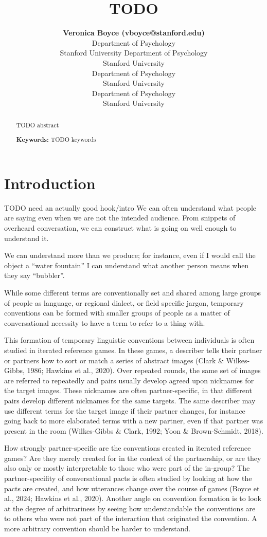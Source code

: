 \documentclass[10pt, letterpaper]{article}
\title{TODO}
\author{{\large \bf Veronica Boyce (vboyce@stanford.edu)} \\ Department of Psychology \\ Stanford University \And {\large \bf Ben Prystawski (benpry@stanford.edu)} Department of Psychology \\ Stanford University \AND {\large \bf Alvin Wei Ming Tan (tanawm@stanford.edu)} \\ Department of Psychology \\ Stanford University \And {\large \bf Michael C. Frank (mcfrank@stanford.edu)} \\ Department of Psychology \\ Stanford University}
\begin{document}
\maketitle

\begin{abstract}
TODO abstract

\textbf{Keywords:}
TODO keywords
\end{abstract}

\section{Introduction}\label{introduction}

TODO need an actually good hook/intro We can often understand what
people are saying even when we are not the intended audience. From
snippets of overheard conversation, we can construct what is going on
well enough to understand it.

We can understand more than we produce; for instance, even if I would
call the object a ``water fountain'' I can understand what another
person means when they say ``bubbler''.

While some different terms are conventionally set and shared among large
groups of people as language, or regional dialect, or field specific
jargon, temporary conventions can be formed with smaller groups of
people as a matter of conversational necessity to have a term to refer
to a thing with.

This formation of temporary linguistic conventions between individuals
is often studied in iterated reference games. In these games, a
describer tells their partner or partners how to sort or match a series
of abstract images (Clark \& Wilkes-Gibbs, 1986; Hawkins et al., 2020).
Over repeated rounds, the same set of images are referred to repeatedly
and pairs usually develop agreed upon nicknames for the target images.
These nicknames are often partner-specific, in that different pairs
develop different nicknames for the same targets. The same describer may
use different terms for the target image if their partner changes, for
instance going back to more elaborated terms with a new partner, even if
that partner was present in the room (Wilkes-Gibbs \& Clark, 1992; Yoon
\& Brown-Schmidt, 2018).

How strongly partner-specific are the conventions created in iterated
reference games? Are they merely created for in the context of the
partnership, or are they also only or mostly interpretable to those who
were part of the in-group? The partner-specifity of conversational pacts
is often studied by looking at how the pacts are created, and how
utterances change over the course of games (Boyce et al., 2024; Hawkins
et al., 2020). Another angle on convention formation is to look at the
degree of arbitrariness by seeing how understandable the conventions are
to others who were not part of the interaction that originated the
convention. A more arbitrary convention should be harder to understand.
\end{document}
